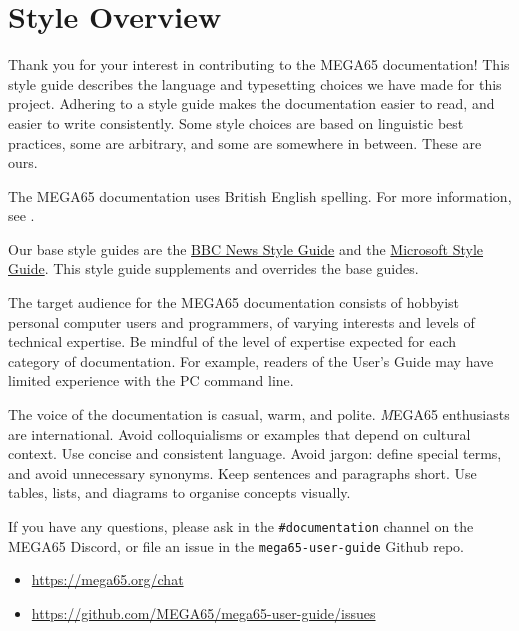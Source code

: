 



\chapter{Style Overview}

Thank you for your interest in contributing to the MEGA65 documentation! This style guide describes the language and typesetting choices we have made for this project. Adhering to a style guide makes the documentation easier to read, and easier to write consistently. Some style choices are based on linguistic best practices, some are arbitrary, and some are somewhere in between. These are ours.

The MEGA65 documentation uses British English spelling. For more information, see .

Our base style guides are the \href{https://www.bbc.co.uk/newsstyleguide/}{BBC News Style Guide} and the \href{https://docs.microsoft.com/en-us/style-guide/welcome/}{Microsoft Style Guide}. This style guide supplements and overrides the base guides.

The target audience for the MEGA65 documentation consists of hobbyist personal computer users and programmers, of varying interests and levels of technical expertise. Be mindful of the level of expertise expected for each category of documentation. For example, readers of the User's Guide may have limited experience with the PC command line.

The voice of the documentation is casual, warm, and polite. {\emph MEGA65 enthusiasts are international.} Avoid colloquialisms or examples that depend on cultural context. Use concise and consistent language. Avoid jargon: define special terms, and avoid unnecessary synonyms. Keep sentences and paragraphs short. Use tables, lists, and diagrams to organise concepts visually.

If you have any questions, please ask in the {\tt \#documentation} channel on the MEGA65 Discord, or file an issue in the {\tt mega65-user-guide} Github repo.

\begin{itemize}
\item \url{https://mega65.org/chat}
\item \url{https://github.com/MEGA65/mega65-user-guide/issues}
\end{itemize}

